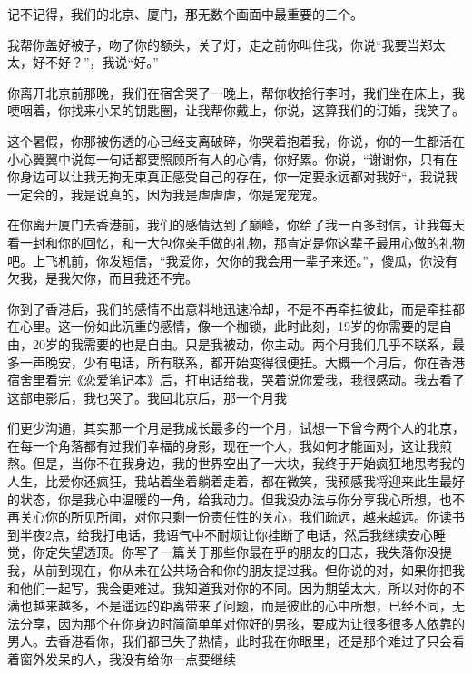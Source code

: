 \documentclass{article}
\begin{document}
记不记得，我们的北京、厦门，那无数个画面中最重要的三个。

我帮你盖好被子，吻了你的额头，关了灯，走之前你叫住我，你说“我要当郑太太，好不好？”，我说“好。”

你离开北京前那晚，我们在宿舍哭了一晚上，帮你收拾行李时，我们坐在床上，我哽咽着，你找来小呆的钥匙圈，让我帮你戴上，你说，这算我们的订婚，我笑了。

\newpage 



这个暑假，你那被伤透的心已经支离破碎，你哭着抱着我，你说，你的一生都活在小心翼翼中说每一句话都要照顾所有人的心情，你好累。你说，“谢谢你，只有在你身边可以让我无拘无束真正感受自己的存在，你一定要永远都对我好“，我说我一定会的，我是说真的，因为我是虐虐虐，你是宠宠宠。

在你离开厦门去香港前，我们的感情达到了巅峰，你给了我一百多封信，让我每天看一封和你的回忆，和一大包你亲手做的礼物，那肯定是你这辈子最用心做的礼物吧。上飞机前，你发短信，“我爱你，欠你的我会用一辈子来还。”，傻瓜，你没有欠我，是我欠你，而且我还不完。

你到了香港后，我们的感情不出意料地迅速冷却，不是不再牵挂彼此，而是牵挂都在心里。这一份如此沉重的感情，像一个枷锁，此时此刻，19岁的你需要的是自由，20岁的我需要的也是自由。只是我被动，你主动。两个月我们几乎不联系，最多一声晚安，少有电话，所有联系，都开始变得很便扭。大概一个月后，你在香港宿舍里看完《恋爱笔记本》后，打电话给我，哭着说你爱我，我很感动。我去看了这部电影后，我也哭了。我回北京后，那一个月我

\newpage 

们更少沟通，其实那一个月是我成长最多的一个月，试想一下曾今两个人的北京，在每一个角落都有过我们幸福的身影，现在一个人，我如何才能面对，这让我煎熬。但是，当你不在我身边，我的世界空出了一大块，我终于开始疯狂地思考我的人生，比爱你还疯狂，我站着坐着躺着走着，都在微笑，我预感我将迎来此生最好的状态，你是我心中温暖的一角，给我动力。但我没办法与你分享我心所想，也不再关心你的所见所闻，对你只剩一份责任性的关心，我们疏远，越来越远。你读书到半夜2点，给我打电话，我语气中不耐烦让你挂断了电话，然后我继续安心睡觉，你定失望透顶。你写了一篇关于那些你最在乎的朋友的日志，我失落你没提我，从前到现在，你从未在公共场合和你的朋友提过我。但你说的对，如果你把我和他们一起写，我会更难过。我知道我对你的不同。因为期望太大，所以对你的不满也越来越多，不是遥远的距离带来了问题，而是彼此的心中所想，已经不同，无法分享，因为那个在你身边时简简单单对你好的男孩，要成为让很多很多人依靠的男人。去香港看你，我们都已失了热情，此时我在你眼里，还是那个难过了只会看着窗外发呆的人，我没有给你一点要继续
\end{document}
